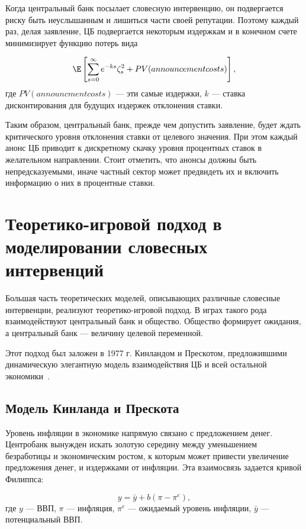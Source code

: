 \documentclass[14pt,a4paper, oneside]{extreport}
\begin{document}
Когда центральный банк посылает словесную интервенцию, он подвергается риску быть неуслышанным и лишиться части своей репутации. Поэтому каждый раз, делая заявление, ЦБ подвергается некоторым издержкам и в конечном счете минимизирует функцию потерь вида

\begin{equation}
\E \left[ \sum_{s=0}^{\infty} e^{-ks} \zeta_s^2 + PV(announcement costs) \right],
\end{equation} где  $PV(announcment costs)$ --- эти самые издержки, $k$ --- ставка дисконтирования для будущих издержек отклонения ставки.

Таким образом, центральный банк, прежде чем допустить заявление, будет ждать критического уровня отклонения ставки от целевого значения. При этом каждый анонс ЦБ приводит к дискретному скачку уровня процентных ставок в желательном направлении. Стоит отметить, что анонсы должны быть непредсказуемыми, иначе частный сектор может предвидеть их и включить информацию о них в процентные ставки.

\section{Теоретико-игровой подход в моделировании словесных интервенций}

Большая часть теоретических моделей, описывающих различные словесные интервенции, реализуют теоретико-игровой подход. В играх такого рода взаимодействуют центральный банк и общество. Общество формирует ожидания, а центральный банк --- величину целевой переменной.

Этот подход был заложен в 1977 г. Кинландом и Прескотом, предложившими динамическую элегантную модель взаимодействия ЦБ и всей остальной экономики~\cite{kydland1977rules}. 

\subsection{Модель Кинланда и Прескота}

Уровень инфляции в экономике напрямую связано с предложением денег. Центробанк вынужден искать золотую середину между уменьшением безработицы и экономическим ростом, к которым может привести увеличение предложения денег, и  издержками от инфляции. Эта взаимосвязь задается кривой Филиппса:

\begin{equation}\label{T3-1}
y = \bar y + b(\pi-\pi^e),
\end{equation}
где $y$ --- ВВП, $\pi$ --- инфляция, $\pi^e$ --- ожидаемый уровень инфляции, $\bar y$ --- потенциальный ВВП.
 
\end{document}
